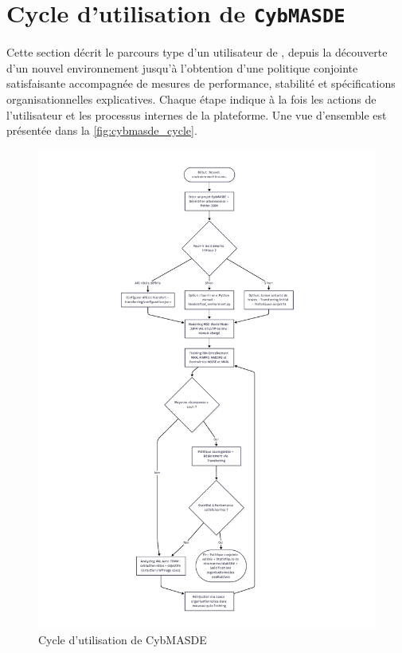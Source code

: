 \section*{Cycle d’utilisation de \texttt{CybMASDE}}\label{sec:cybmasde_cycle}

Cette section décrit le parcours type d’un utilisateur de , depuis la découverte d’un nouvel environnement jusqu’à l’obtention d’une politique conjointe satisfaisante accompagnée de mesures de performance, stabilité et spécifications organisationnelles explicatives. Chaque étape indique à la fois les actions de l’utilisateur et les processus internes de la plateforme. Une vue d’ensemble est présentée dans la \autoref{fig:cybmasde_cycle}.

\begin{figure}
  \centering
  \includegraphics[trim={5cm 1cm 5cm 1cm},clip,height=\textheight]{figures/CybMASDE_user_flowchart.pdf}
  \caption{Cycle d’utilisation de CybMASDE}
  \label{fig:cybmasde_cycle}
\end{figure}

